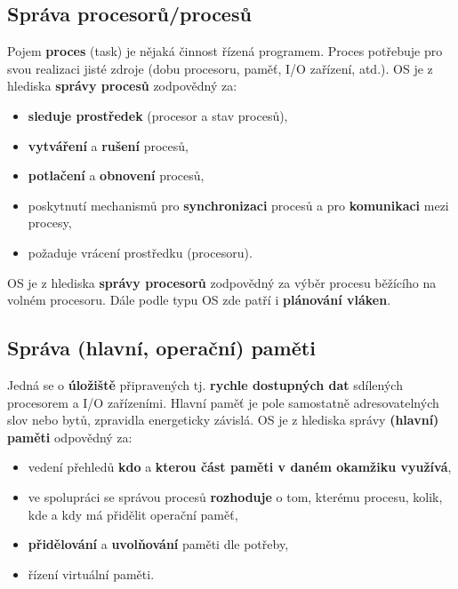 \subsection{Správa procesorů/procesů}
Pojem \textbf{proces} (task) je nějaká činnost řízená programem. Proces potřebuje pro svou realizaci jisté zdroje (dobu procesoru, paměť, I/O zařízení, atd.). OS je z hlediska \textbf{správy procesů} zodpovědný za:
\begin{itemize}
    \item \textbf{sleduje prostředek} (procesor a stav procesů),
    \item \textbf{vytváření} a \textbf{rušení} procesů,
    \item \textbf{potlačení} a \textbf{obnovení} procesů,
    \item poskytnutí mechanismů pro \textbf{synchronizaci} procesů a pro \textbf{komunikaci} mezi procesy,
    \item požaduje vrácení prostředku (procesoru).
\end{itemize}
OS je z hlediska \textbf{správy procesorů} zodpovědný za výběr procesu běžícího na volném procesoru. Dále podle typu OS zde patří i \textbf{plánování vláken}.

\subsection{Správa (hlavní, operační) paměti}
Jedná se o \textbf{úložiště} připravených tj. \textbf{rychle dostupných dat} sdílených procesorem a I/O zařízeními. Hlavní paměť je pole samostatně adresovatelných slov nebo bytů, zpravidla energeticky závislá. OS je z hlediska správy \textbf{(hlavní) paměti} odpovědný za:
\begin{itemize}
    \item vedení přehledů \textbf{kdo} a \textbf{kterou část paměti v daném okamžiku využívá},
    \item ve spolupráci se správou procesů \textbf{rozhoduje} o tom, kterému procesu, kolik, kde a kdy má přidělit operační paměť,
    \item \textbf{přidělování} a \textbf{uvolňování} paměti dle potřeby,
    \item řízení virtuální paměti.
\end{itemize}

